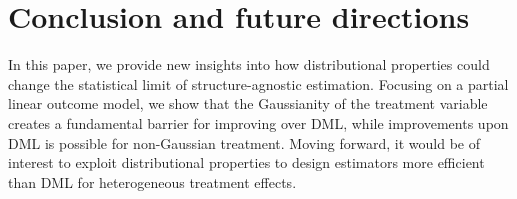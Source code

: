 \documentclass{article}
\begin{document}
%

%

%
%
%
%
%
%
%

%

%

%

%

%

%
%
%
%
%
%

%

%

%



\section{Conclusion and future directions}
\label{sec:conclusion}

%
%
In this paper, we provide new insights into how distributional properties could change the statistical limit of structure-agnostic estimation. Focusing on a partial linear outcome model, we show that the Gaussianity of the treatment variable creates a fundamental barrier for improving over DML, while improvements upon DML is possible for non-Gaussian treatment.
Moving forward, it would be of interest to exploit distributional properties to design estimators more efficient than DML for heterogeneous treatment effects.

%
%

\newpage


\end{document}

